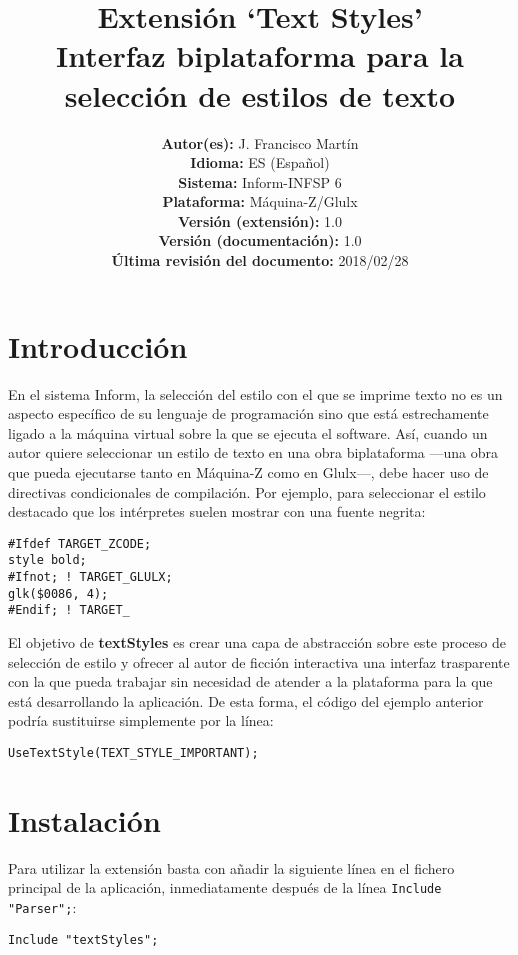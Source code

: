 \documentclass[a4paper,12pt]{article}
\title{\vspace{-3cm}Extensión `Text Styles' \\
    \Large{Interfaz biplataforma para la selección de estilos de texto}}
\author{
	\small{\textbf{Autor(es):} J. Francisco Martín}\\
	\small{\textbf{Idioma:} ES (Español)}\\
	\small{\textbf{Sistema:} Inform-INFSP 6}\\
	\small{\textbf{Plataforma:} Máquina-Z/Glulx}\\
	\small{\textbf{Versión (extensión):} 1.0}\\
	\small{\textbf{Versión (documentación):} 1.0}\\
	\small{\textbf{Última revisión del documento:} 2018/02/28}
}
\date{}
\numberwithin{equation}{section}
\begin{document}
\maketitle


\section{Introducción} \label{sec:introduccion}

En el sistema Inform, la selección del estilo con el que se imprime texto no es un aspecto específico de su lenguaje de programación sino que está estrechamente ligado a la máquina virtual sobre la que se ejecuta el software. Así, cuando un autor quiere seleccionar un estilo de texto en una obra biplataforma ---una obra que pueda ejecutarse tanto en Máquina-Z como en Glulx---, debe hacer uso de directivas condicionales de compilación. Por ejemplo, para seleccionar el estilo destacado que los intérpretes suelen mostrar con una fuente negrita:

\begin{verbatim}
#Ifdef TARGET_ZCODE;
style bold;
#Ifnot; ! TARGET_GLULX;
glk($0086, 4);
#Endif; ! TARGET_
\end{verbatim}

El objetivo de \textbf{textStyles} es crear una capa de abstracción sobre este proceso de selección de estilo y ofrecer al autor de ficción interactiva una interfaz trasparente con la que pueda trabajar sin necesidad de atender a la plataforma para la que está desarrollando la aplicación. De esta forma, el código del ejemplo anterior podría sustituirse simplemente por la línea:

\begin{verbatim}
UseTextStyle(TEXT_STYLE_IMPORTANT);
\end{verbatim}


\section{Instalación} \label{sec:instalacion}

Para utilizar la extensión basta con añadir la siguiente línea en el fichero principal de la aplicación, inmediatamente después de la línea \verb|Include "Parser";|:

\begin{verbatim}
Include "textStyles";
\end{verbatim}
\end{document}
